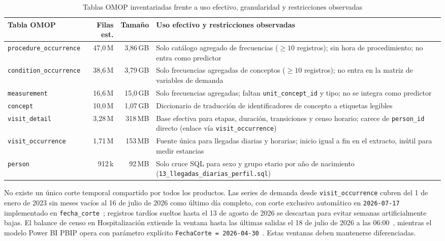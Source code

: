 \begin{table}[t]
\caption{Tablas OMOP inventariadas frente a uso efectivo, granularidad y restricciones observadas}
\label{tab:omop_uso}
\centering
\footnotesize
\begin{tabularx}{\textwidth}{@{}L{0.22\textwidth} r r Y@{}}
\toprule
Tabla OMOP & Filas est. & Tamaño & Uso efectivo y restricciones observadas \\
\midrule
\texttt{procedure\_occurrence} & 47,0\,M & 3,86\,GB & Solo catálogo agregado de frecuencias ($\ge 10$ registros); sin hora de procedimiento; no entra como predictor \\
\texttt{condition\_occurrence} & 38,6\,M & 3,79\,GB & Solo frecuencias agregadas de conceptos ($\ge 10$ registros); no entra en la matriz de variables de demanda \\
\texttt{measurement} & 16,6\,M & 15,0\,GB & Solo frecuencias agregadas; faltan \texttt{unit\_concept\_id} y tipo; no se integra como predictor \\
\texttt{concept} & 10,0\,M & 1,07\,GB & Diccionario de traducción de identificadores de concepto a etiquetas legibles \\
\texttt{visit\_detail} & 3,28\,M & 318\,MB & Base efectiva para etapas, duración, transiciones y censo horario; carece de \texttt{person\_id} directo (enlace vía \texttt{visit\_occurrence}) \\
\texttt{visit\_occurrence} & 1,71\,M & 153\,MB & Fuente única para llegadas diarias y horarias; inicio igual a fin en el extracto, inútil para medir estancias \\
\texttt{person} & 912\,k & 92\,MB & Solo cruce SQL para sexo y grupo etario por año de nacimiento (\texttt{13\_llegadas\_diarias\_perfil.sql}) \\
\bottomrule
\end{tabularx}
\end{table}

No existe un único corte temporal compartido por todos los productos. Las series de demanda desde \texttt{visit\_occurrence} cubren del 1 de enero de 2023 sin meses vacíos al 16 de julio de 2026 como último día completo, con corte exclusivo automático en \texttt{2026-07-17} implementado en \texttt{fecha\_corte}~\cite{mediflow2026inventario,mediflow2026bundle}; registros tardíos sueltos hasta el 13 de agosto de 2026 se descartan para evitar semanas artificialmente bajas. El balance de censo en Hospitalización extiende la ventana hasta las últimas salidas el 18 de julio de 2026 a las 06:00~\cite{mediflow2026informe}, mientras el modelo Power BI PBIP opera con parámetro explícito \texttt{FechaCorte = 2026-04-30}~\cite{mediflow2026pbip}. Estas ventanas deben mantenerse diferenciadas.

